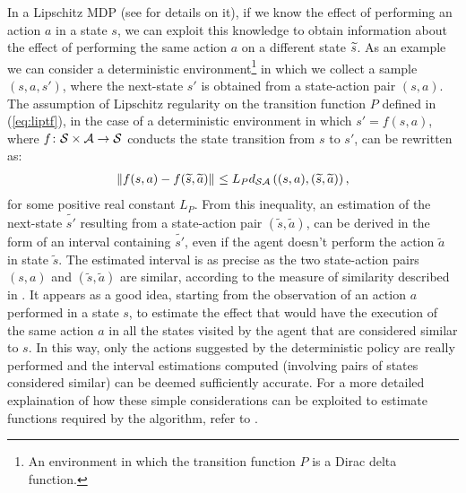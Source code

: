 \newline
In a Lipschitz \ac{MDP} (see  for details on it), if we know the effect of performing an action $a$ in a state $s$, we can exploit this knowledge to obtain information about the effect of performing the same action $a$ on a different state $\widetilde{s}$.
As an example we can consider a deterministic environment\footnote{An environment in which the transition function $P$ is a Dirac delta function.} in which we collect a sample $(s,a,s')$, where the next-state $s'$ is obtained from a state-action pair $(s, a)$. The assumption of Lipschitz regularity on the transition function $P$ defined in (\ref{eq:liptf}), in the case of a deterministic environment in which $s' = f(s,a)$, where $f\colon\mathcal{S}\times\mathcal{A}\to\mathcal{S}$ conducts the state transition from $s$ to $s'$, can be rewritten as:
\begin{align}
	\left\|f(s,a)-f(\widetilde{s},\widetilde{a})\right\|_{} \leq L_{P}d_{\mathcal{S}\mathcal{A}}\left((s,a),(\widetilde{s},\widetilde{a})\right),
\end{align}
for some positive real constant $L_{P}$. From this inequality, an estimation of the next-state $\widetilde{s'}$ resulting from a state-action pair $(\widetilde{s}, \widetilde{a})$, can be derived in the form of an interval containing $\widetilde{s'}$, even if the agent doesn't perform the action $\widetilde{a}$ in state $\widetilde{s}$. The estimated interval is as precise as the two state-action pairs $(s, a)$ and $(\widetilde{s}, \widetilde{a})$ are similar, according to the measure of similarity described in .
It appears as a good idea, starting from the observation of an action $a$ performed in a state $s$, to estimate the effect that would have the execution of the same action $a$ in all the states visited by the agent that are considered similar to $s$. In this way, only the actions suggested by the deterministic policy are really performed and the interval estimations computed (involving pairs of states considered similar) can be deemed sufficiently accurate. For a more detailed explaination of how these simple considerations can be exploited to estimate functions required by the algorithm, refer to .
